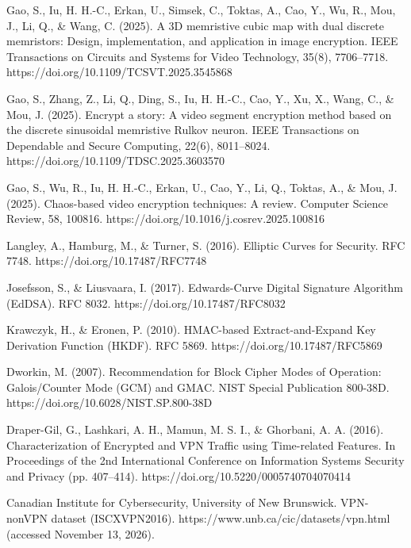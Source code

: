\documentclass[preprint,12pt]{elsarticle}
\theoremstyle{plain}
\providecommand{\DIFdeltex}[1]{{\protect\color{red} \scriptsize #1}} %
\providecommand{\DIFdelend}{} %
\providecommand{\DIFdel}[1]{\texorpdfstring{\DIFdeltex{#1}}{}} %
\DeclareRobustCommand{\DIFdelend}{\DIFOaddend \let\includegraphics\DIFOincludegraphics} %
\renewcommand{\DIFdel}[1]{}
\begin{document}
\begin{thebibliography}{28}
\DIFdel{Wang, C., Ma, W., Zhang, S., Gui, J., Li, Q., Liu, Y., \& Xia, Z. (2026). Focus on finding deepfakes: A robust proactive detection method based on orthogonal moment watermarking. IEEE Transactions on Image Processing, 35, 3507--3521. https://doi.org/10.1109/TIP.2026.3678069
}\DIFdelend 

Gao, S., Iu, H. H.-C., Erkan, U., Simsek, C., Toktas, A., Cao, Y., Wu, R., Mou, J., Li, Q., \& Wang, C. (2025). A 3D memristive cubic map with dual discrete memristors: Design, implementation, and application in image encryption. IEEE Transactions on Circuits and Systems for Video Technology, 35(8), 7706--7718. https://doi.org/10.1109/TCSVT.2025.3545868

Gao, S., Zhang, Z., Li, Q., Ding, S., Iu, H. H.-C., Cao, Y., Xu, X., Wang, C., \& Mou, J. (2025). Encrypt a story: A video segment encryption method based on the discrete sinusoidal memristive Rulkov neuron. IEEE Transactions on Dependable and Secure Computing, 22(6), 8011--8024. https://doi.org/10.1109/TDSC.2025.3603570

Gao, S., Wu, R., Iu, H. H.-C., Erkan, U., Cao, Y., Li, Q., Toktas, A., \& Mou, J. (2025). Chaos-based video encryption techniques: A review. Computer Science Review, 58, 100816. https://doi.org/10.1016/j.cosrev.2025.100816

Langley, A., Hamburg, M., \& Turner, S. (2016). Elliptic Curves for Security. RFC 7748. https://doi.org/10.17487/RFC7748

Josefsson, S., \& Liusvaara, I. (2017). Edwards-Curve Digital Signature Algorithm (EdDSA). RFC 8032. https://doi.org/10.17487/RFC8032

Krawczyk, H., \& Eronen, P. (2010). HMAC-based Extract-and-Expand Key Derivation Function (HKDF). RFC 5869. https://doi.org/10.17487/RFC5869

Dworkin, M. (2007). Recommendation for Block Cipher Modes of Operation: Galois/Counter Mode (GCM) and GMAC. NIST Special Publication 800-38D. https://doi.org/10.6028/NIST.SP.800-38D

Draper-Gil, G., Lashkari, A. H., Mamun, M. S. I., \& Ghorbani, A. A. (2016). Characterization of Encrypted and VPN Traffic using Time-related Features. In Proceedings of the 2nd International Conference on Information Systems Security and Privacy (pp. 407--414). https://doi.org/10.5220/0005740704070414

Canadian Institute for Cybersecurity, University of New Brunswick. VPN-nonVPN dataset (ISCXVPN2016). https://www.unb.ca/cic/datasets/vpn.html (accessed November 13, 2026).

\end{thebibliography}
\end{document}
